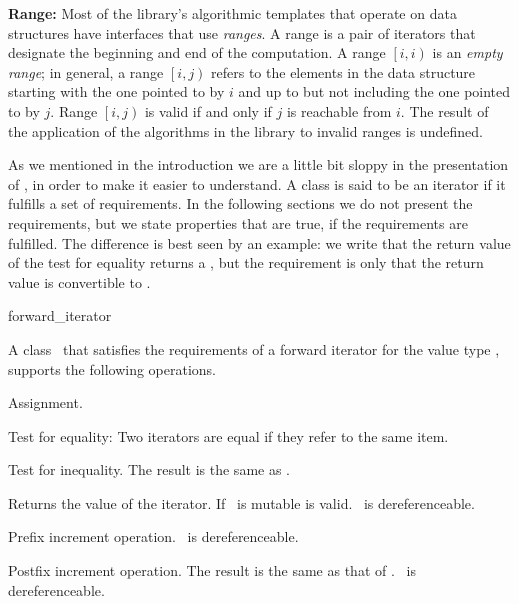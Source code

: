 {\bf Range:}
Most of the library's algorithmic templates that operate on data
structures have interfaces that use {\em ranges}. A range is a pair of
iterators that designate the beginning and end of the computation. A
range $\left[i, i\right)$ is an {\em empty range}; in general, a range
$\left[i, j\right)$ refers to the elements in the data structure
starting with the one pointed to by $i$ and up to but not including the
one pointed to by $j$. Range $\left[i, j\right)$ is valid if and only if $j$
is reachable from $i$.  The  result  of  the  application  of  the  
algorithms  in  the  library  to  invalid  ranges  is undefined.

\medskip

As we mentioned in the introduction we are a little bit sloppy in the
presentation of \stl, in order to make it easier to understand.  A
class is said to be an iterator if it fulfills a set of requirements.
In the following sections we do not present the requirements, but we
state properties that are true, if the requirements are fulfilled.
The difference is best seen by an example: we write that the return
value of the test for equality returns a , but the
requirement is only that the return value is convertible to .

\newpage




\begin{ccClass}{forward_iterator}


\ccDefinition

A class \ccClassName\ that satisfies the requirements of a forward iterator
for the value type , supports the following operations.

\ccCreation
{}

{}

{}

\ccOperations

{Assignment.}

{Test for equality: Two iterators are equal if they refer to the same item.}

{Test for inequality. The result is the same as .}

{Returns the value of the iterator.
 If \ccClassName\ is mutable  is valid.
 \ccPrecond \ccVar\ is dereferenceable.}

{Prefix increment operation.
\ccPrecond \ccVar\ is dereferenceable.}

{Postfix increment operation. The result is the same as that of 
 .
\ccPrecond \ccVar\ is dereferenceable.}

\end{ccClass} 


